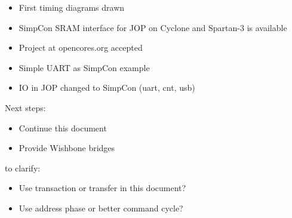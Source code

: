 \begin{itemize}
    \item First timing diagrams drawn
    \item SimpCon SRAM interface for JOP on Cyclone and Spartan-3 is
    available
    \item Project at opencores.org accepted
    \item Simple UART as SimpCon example
    \item IO in JOP changed to SimpCon (uart, cnt, usb)
\end{itemize}
%
Next steps:
%
\begin{itemize}
    \item Continue this document
    \item Provide Wishbone bridges
\end{itemize}
%
to clarify:
\begin{itemize}
    \item Use transaction or transfer in this document?
    \item Use address phase or better command cycle?
\end{itemize}
